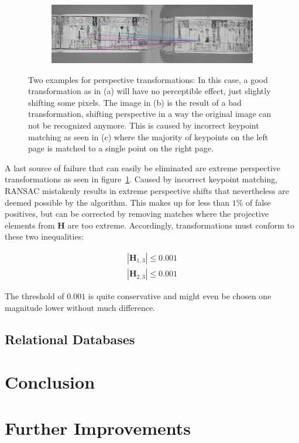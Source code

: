 \documentclass{ltjarticle}
\begin{document}
\begin{figure}
\begin{subfigure}{.49\textwidth}
        \caption{}
    \end{subfigure}
    \begin{subfigure}{\textwidth}
        \includegraphics[width=\textwidth]{homography-cause.jpg}
        \caption{}
    \end{subfigure}
    \caption{Two examples for perspective transformations: In this case, a good transformation as in (a) will have no perceptible effect, just slightly shifting some pixels. The image in (b) is the result of a bad transformation, shifting perspective in a way the original image can not be recognized anymore. This is caused by incorrect keypoint matching as seen in (c) where the majority of keypoints on the left page is matched to a single point on the right page.}
    \label{fig:homography-compare}
\end{figure}

A last source of failure that can easily be eliminated are extreme perspective transformations as seen in figure~\ref{fig:homography-compare}. Caused by incorrect keypoint matching, RANSAC mistakenly results in extreme perspective shifts that nevertheless are deemed possible by the algorithm. This makes up for less than $1\%$ of false positives, but can be corrected by removing matches where the projective elements from $\mathbf{H}$ are too extreme. Accordingly, transformations must conform to these two inequalities:

\begin{gather*}
    |\mathbf{H}_{1,3}| \leq 0.001\\
    |\mathbf{H}_{2,3}| \leq 0.001
\end{gather*}

The threshold of $0.001$ is quite conservative and might even be chosen one magnitude lower without much difference.

\subsection{Relational Databases}



\section{Conclusion}

\section{Further Improvements}

\printbibliography
\end{document}
